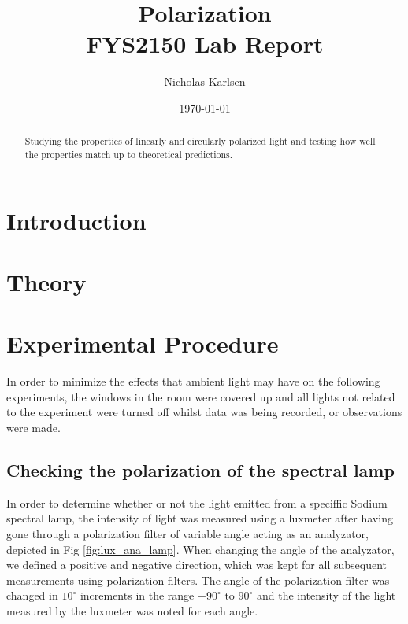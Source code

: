 \documentclass[11pt,a4paper]{article}
\begin{document}
\title{Polarization\\
\normalsize{FYS2150 Lab Report}\\}

\author{Nicholas Karlsen}

\date{\today}%

\maketitle
\begin{abstract}
  Studying the properties of linearly and circularly polarized light and testing how well the properties match up to theoretical predictions.
\end{abstract}

\twocolumn


\section{\label{sect:intro}Introduction}
  

\section{\label{sect:theory}Theory}

\section{\label{section:experimental}Experimental Procedure} 
  
  In order to minimize the effects that ambient light may have on the following experiments, the windows in the room were covered up and all lights not related to the experiment were turned off whilst data was being recorded, or observations were made.

  \subsection{Checking the polarization of the spectral lamp}
    In order to determine whether or not the light emitted from a speciffic Sodium spectral lamp, the intensity of light was measured using a luxmeter  after having gone through a polarization filter of variable angle acting as an analyzator, depicted in Fig \ref{fig:lux_ana_lamp}. When changing the angle of the analyzator, we defined a positive and negative direction, which was kept for all subsequent measurements using polarization filters. The angle of the polarization filter was changed in $10^\circ$ increments in the range $-90^\circ$ to $90^\circ$ and the intensity of the light measured by the luxmeter was noted for each angle. 
\end{document}
